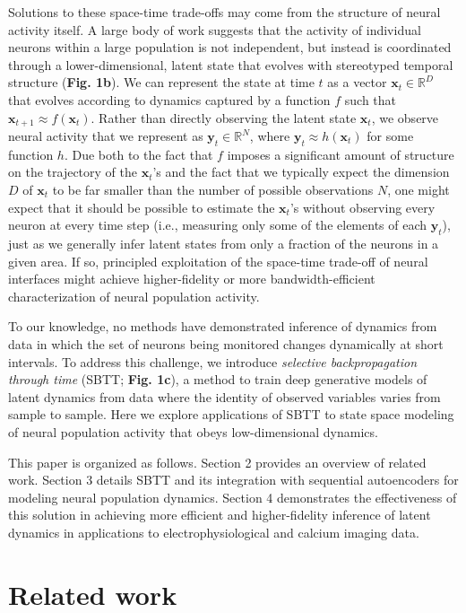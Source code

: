 \documentclass{article}
\newcommand{\vct}[1]{\boldsymbol{#1}}
\newcommand{\vx}{\vct{x}}
\newcommand{\vy}{\vct{y}}
\begin{document}
Solutions to these space-time trade-offs may come from the structure of neural activity itself. A large body of work suggests that the activity of individual neurons within a large population is not independent, but instead is coordinated through a lower-dimensional, latent state that evolves with stereotyped temporal structure (\textbf{Fig. 1b}). We can represent the state at time $t$ as a vector $\vx_t \in \mathbb{R}^D$ that evolves according to dynamics captured by a function $f$ such that $\vx_{t+1} \approx f(\vx_t)$. Rather than directly observing the latent state $\vx_t$, we observe neural activity that we represent as $\vy_t \in \mathbb{R}^N$, where $\vy_t \approx h(\vx_t)$ for some function $h$. Due both to the fact that $f$ imposes a significant amount of structure on the trajectory of the $\vx_t$'s and the fact that we typically expect the dimension $D$ of $\vx_t$ to be far smaller than the number of possible observations $N$, one might expect that it should be possible to estimate the $\vx_t$'s without observing every neuron at every time step (i.e., measuring only some of the elements of each $\vy_t$), just as we generally infer latent states from only a fraction of the neurons in a given area. If so, principled exploitation of the space-time trade-off of neural interfaces might achieve higher-fidelity or more bandwidth-efficient characterization of neural population activity.

To our knowledge, no methods have demonstrated inference of dynamics from data in which the set of neurons being monitored changes dynamically at short intervals. To address this challenge, we introduce \textit{selective backpropagation through time} (SBTT; \textbf{Fig. 1c}), a method to train deep generative models of latent dynamics from data where the identity of observed variables varies from sample to sample. Here we explore applications of SBTT to state space modeling of neural population activity that obeys low-dimensional dynamics.

This paper is organized as follows. Section 2 provides an overview of related work. Section 3 details SBTT and its integration with sequential autoencoders for modeling neural population dynamics. Section 4 demonstrates the effectiveness of this solution in achieving more efficient and higher-fidelity inference of latent dynamics in applications to electrophysiological and calcium imaging data.

\section{Related work}
\end{document}

